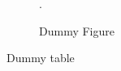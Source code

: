 \documentclass{article}
\begin{document}
	\begin{figure}
		\caption{Dummy Figure}.
	\end{figure}

	\begin{table}
		\caption{Dummy table}
	\end{table}

	\newpage
	
	\begin{appendix}
		\listoffigures
		\listoftables
	\end{appendix}
\end{document}
